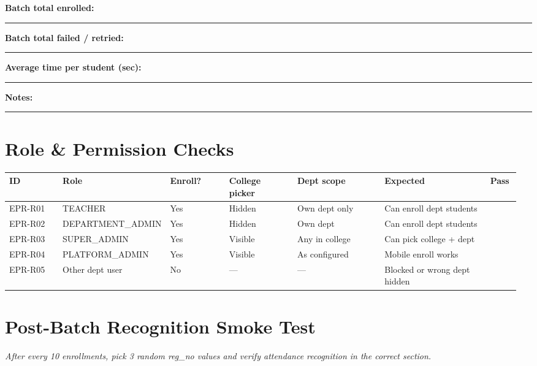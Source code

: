 \documentclass[11pt,a4paper,oneside]{article}
\newcommand{\chk}{\fbox{\rule{0pt}{0.95ex}\rule{0.95ex}{0pt}}}
\newcommand{\fillin}[1][3cm]{\rule{#1}{0.4pt}}
\newcommand{\fillinlong}{\rule{0.72\textwidth}{0.4pt}}
\newcommand{\notesblock}{\par\smallskip\noindent\textbf{Notes:}\ \fillinlong\par\smallskip}
\newcommand{\fieldline}[1]{\par\smallskip\noindent\textbf{#1}\ \fillin\par}
\begin{document}
\fieldline{Batch total enrolled:}
\fieldline{Batch total failed / retried:}
\fieldline{Average time per student (sec):}
\notesblock

\section{Role \& Permission Checks}

\small
\begin{tabular}{@{}>{\raggedright\arraybackslash}p{0.11\linewidth} >{\raggedright\arraybackslash}p{0.14\linewidth} >{\raggedright\arraybackslash}p{0.12\linewidth} >{\raggedright\arraybackslash}p{0.14\linewidth} >{\raggedright\arraybackslash}p{0.18\linewidth} >{\raggedright\arraybackslash}p{0.22\linewidth} >{\centering\arraybackslash}p{0.06\linewidth}@{}}
  \toprule
  \textbf{ID} & \textbf{Role} & \textbf{Enroll?} & \textbf{College picker} & \textbf{Dept scope} & \textbf{Expected} & \textbf{Pass} \\
  \midrule
  EPR-R01 & TEACHER           & Yes & Hidden      & Own dept only     & Can enroll dept students     & \chk \\
  EPR-R02 & DEPARTMENT\_ADMIN & Yes & Hidden      & Own dept          & Can enroll dept students     & \chk \\
  EPR-R03 & SUPER\_ADMIN      & Yes & Visible     & Any in college    & Can pick college + dept      & \chk \\
  EPR-R04 & PLATFORM\_ADMIN   & Yes & Visible     & As configured     & Mobile enroll works          & \chk \\
  EPR-R05 & Other dept user   & No  & ---         & ---               & Blocked or wrong dept hidden & \chk \\
  \bottomrule
\end{tabular}
\normalsize

\section{Post-Batch Recognition Smoke Test}

\noindent\textit{After every 10 enrollments, pick 3 random reg\_no values and verify attendance recognition in the correct section.}
\end{document}
